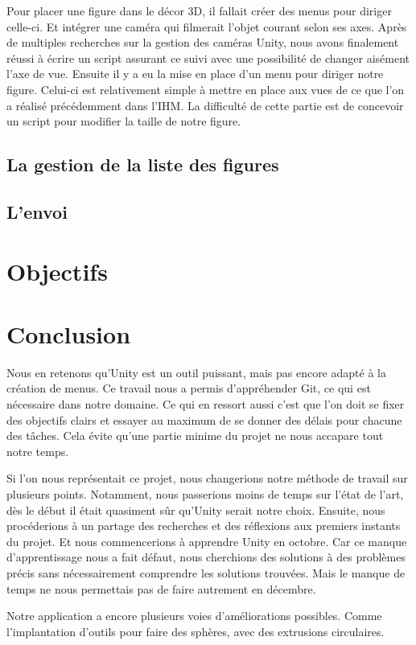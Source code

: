 \documentclass[a4paper,11pt]{article}
\begin{document}
			Pour placer une figure dans le décor 3D, il fallait créer des menus pour diriger celle-ci. Et intégrer une caméra qui filmerait l'objet courant selon ses axes. Après de multiples recherches sur la gestion des caméras Unity, nous avons finalement réussi à écrire un script assurant ce suivi avec une possibilité de changer aisément l'axe de vue. Ensuite il y a eu la mise en place d'un menu pour diriger notre figure. Celui-ci est relativement simple à mettre en place aux vues de ce que l'on a réalisé précédemment dans l'IHM. La difficulté de cette partie est de concevoir un script pour modifier la taille de notre figure.

		\subsection{La gestion de la liste des figures}
		\subsection{L'envoi}
	\section{Objectifs}
	\section{Conclusion}
			Nous en retenons qu'Unity est un outil puissant, mais pas encore adapté à la création de menus. Ce travail nous a permis d'appréhender Git, ce qui est nécessaire dans notre domaine. Ce qui en ressort aussi c'est que l'on doit se fixer des objectifs clairs et essayer au maximum de se donner des délais pour chacune des tâches. Cela évite qu'une partie minime du projet ne nous accapare tout notre temps.
			
			Si l'on nous représentait ce projet, nous changerions notre méthode de travail sur plusieurs points. Notamment, nous passerions moins de temps sur l'état de l'art, dès le début il était quasiment sûr qu'Unity serait notre choix. Ensuite, nous procéderions à un partage des recherches et des réflexions aux premiers instants du projet. Et nous commencerions à apprendre Unity en octobre. Car ce manque d'apprentissage nous a fait défaut, nous cherchions des solutions à des problèmes précis sans nécessairement comprendre les solutions trouvées. Mais le manque de temps ne nous permettais pas de faire autrement en décembre.
			
			Notre application a encore plusieurs voies d'améliorations possibles. Comme l'implantation d'outils pour faire des sphères, avec des extrusions circulaires.
	
\end{document}
